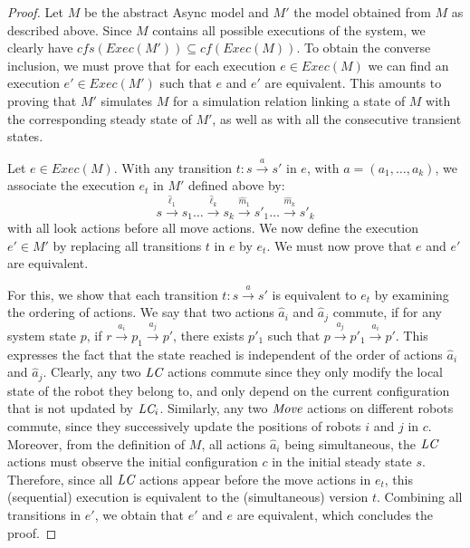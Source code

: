 \begin{proof} Let $M$ be the abstract Async model and $M'$ the model
  obtained from $M$ as described above. Since $M$ contains all possible executions of the system,
  we clearly have $\textit{cfs}(\textit{Exec}(M')) \subseteq
  \textit{cf}(\textit{Exec}(M))$. To obtain the converse inclusion, we
  must prove that for each execution $e \in \textit{Exec}(M)$ we can
  find an execution $e' \in \textit{Exec}(M')$ such that $e$ and $e'$
  are equivalent.  This amounts to proving that $M'$ simulates $M$ for a
  simulation relation linking a state of $M$ with the corresponding
  steady state of $M'$, as well as with all the consecutive transient
  states.


  Let $e \in \textit{Exec}(M)$. With any transition $t: s
  \xrightarrow{a} s'$ in $e$, with $a=(a_1, \ldots, a_k)$, we
  associate the execution $e_t$ in $M'$ defined above by: $$s
  \xrightarrow{\hat{\ell}_1} s_1 \ldots \xrightarrow{\hat{\ell}_k} s_k
  \xrightarrow{\hat{m}_1} s'_1 \ldots \xrightarrow{\hat{m}_k} s'_k$$
  with all look actions before all move actions.  We now define the
  execution $e' \in M'$ by replacing all transitions $t$ in $e$ by
  $e_t$. We must now prove that $e$ and $e'$ are equivalent.

  For this, we show that each transition $t: s \xrightarrow{a} s'$ is
  equivalent to $e_t$ by examining the ordering of actions. We say
  that two actions $\hat{a}_i$ and $\hat{a}_j$ commute, 
  if for any system state $p$, if
  $r\xrightarrow{a_i} p_1 \xrightarrow{a_j} p'$, there exists $p'_1$
  such that $p \xrightarrow{a_j} p'_1 \xrightarrow{a_i} p'$. This
  expresses the fact that the state reached is independent of the
  order of actions $\hat{a}_i$ and $\hat{a}_j$. Clearly, any two
  $\textit{LC}$ actions commute since they only modify the local state
  of the robot they belong to, and only depend on the current
  configuration that is not updated by $\textit{LC}_i$. Similarly, any two
  $\mathit{Move}$ actions on different robots commute, since they
  successively update the positions of robots $i$ and $j$ in
  $c$. Moreover, from the definition of $M$, all actions $\hat{a}_i$
  being simultaneous, the $\textit{LC}$ actions must observe the
  initial configuration $c$ in the initial steady state
  $s$. Therefore, since all $\textit{LC}$ actions appear before the
  move actions in $e_t$, this (sequential) execution is equivalent to
  the (simultaneous) version $t$. Combining all transitions in $e'$,
  we obtain that $e'$ and $e$ are equivalent, which concludes the
  proof.
\end{proof}
		
